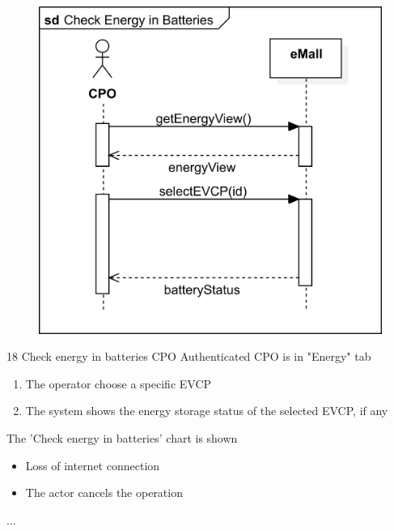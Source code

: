 \pagebreak
\usecase
{
    \begin{figure}[H]
        \centering
        \includegraphics[scale=0.9]{src/sequence_diagram/checkEnergy.png}
    \end{figure}
}
{18}
{Check energy in batteries} %
{CPO} %
{Authenticated CPO is in "Energy" tab} %
{ %
    \begin{enumerate}
        \item The operator choose a specific EVCP
        \item The system shows the energy storage status of the selected EVCP, if any
    \end{enumerate}
}
{The 'Check energy in batteries' chart is shown} %
{ %
    \begin{itemize}
        \item Loss of internet connection
        \item The actor cancels the operation
    \end{itemize}
}
{ %
    ...
}

